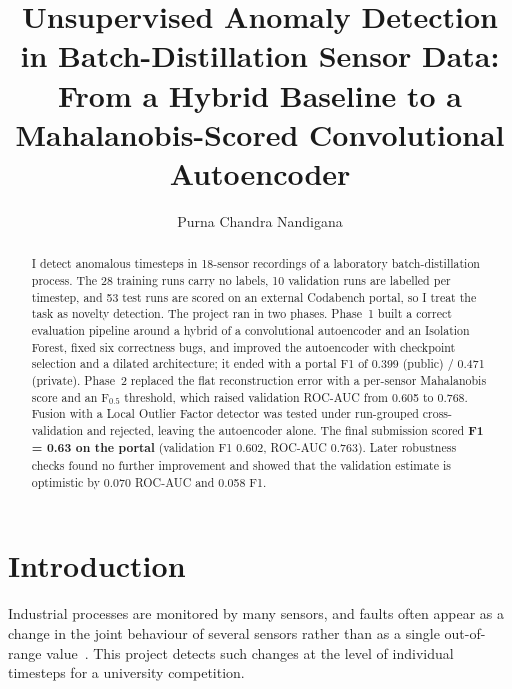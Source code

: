 \documentclass[runningheads]{llncs}
\begin{document}
\title{Unsupervised Anomaly Detection in Batch-Distillation Sensor Data: From a Hybrid Baseline to a Mahalanobis-Scored Convolutional Autoencoder}

\author{Purna Chandra Nandigana}

\maketitle

\begin{abstract}
I detect anomalous timesteps in 18-sensor recordings of a laboratory batch-distillation process. The 28 training runs carry no labels, 10 validation runs are labelled per timestep, and 53 test runs are scored on an external Codabench portal, so I treat the task as novelty detection. The project ran in two phases. Phase~1 built a correct evaluation pipeline around a hybrid of a convolutional autoencoder and an Isolation Forest, fixed six correctness bugs, and improved the autoencoder with checkpoint selection and a dilated architecture; it ended with a portal F1 of 0.399 (public) / 0.471 (private). Phase~2 replaced the flat reconstruction error with a per-sensor Mahalanobis score and an F$_{0.5}$ threshold, which raised validation ROC-AUC from 0.605 to 0.768. Fusion with a Local Outlier Factor detector was tested under run-grouped cross-validation and rejected, leaving the autoencoder alone. The final submission scored \textbf{F1 = 0.63 on the portal} (validation F1 0.602, ROC-AUC 0.763). Later robustness checks found no further improvement and showed that the validation estimate is optimistic by 0.070 ROC-AUC and 0.058 F1.
\end{abstract}

\section{Introduction}

Industrial processes are monitored by many sensors, and faults often appear as a change in the joint behaviour of several sensors rather than as a single out-of-range value~\cite{malhotra2016lstm,hundman2018detecting,audibert2020usad}. This project detects such changes at the level of individual timesteps for a university competition.
\end{document}
